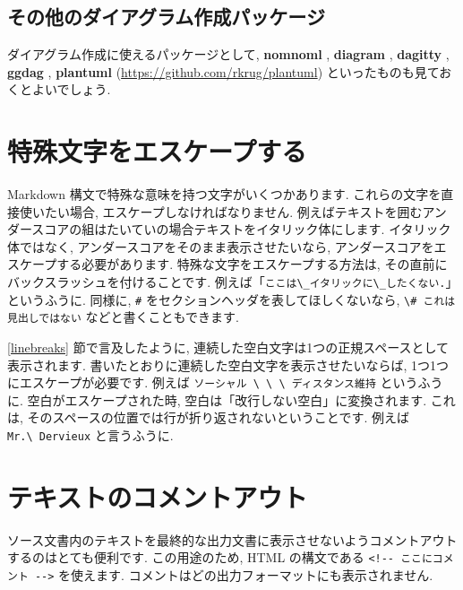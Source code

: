 \documentclass[
  11pt,
  lualatex,
  ja=standard]{bxjsreport}
\begin{document}
\hypertarget{other-packages-for-making-diagrams}{%
\subsection{その他のダイアグラム作成パッケージ}\label{other-packages-for-making-diagrams}}

ダイアグラム作成に使えるパッケージとして, \textbf{nomnoml} \autocite{R-nomnoml}, \textbf{diagram} \autocite{R-diagram}, \textbf{dagitty} \autocite{R-dagitty}, \textbf{ggdag} \autocite{R-ggdag}, \textbf{plantuml} (\url{https://github.com/rkrug/plantuml}) といったものも見ておくとよいでしょう.

\hypertarget{special-chars}{%
\section{特殊文字をエスケープする}\label{special-chars}}

Markdown 構文で特殊な意味を持つ文字がいくつかあります. これらの文字を直接使いたい場合, エスケープしなければなりません. 例えばテキストを囲むアンダースコアの組はたいていの場合テキストをイタリック体にします. イタリック体ではなく, アンダースコアをそのまま表示させたいなら, アンダースコアをエスケープする必要があります. 特殊な文字をエスケープする方法は, その直前にバックスラッシュを付けることです. 例えば「\texttt{ここは\textbackslash{}\_イタリックに\textbackslash{}\_したくない.}」というふうに. 同様に, \texttt{\#} をセクションヘッダを表してほしくないなら, \texttt{\textbackslash{}\#\ これは見出しではない} などと書くこともできます.

\ref{linebreaks} 節で言及したように, 連続した空白文字は1つの正規スペースとして表示されます. 書いたとおりに連続した空白文字を表示させたいならば, 1つ1つにエスケープが必要です. 例えば \texttt{ソーシャル \textbackslash{}\ \textbackslash{}\ \textbackslash{}\ ディスタンス維持} というふうに. 空白がエスケープされた時, 空白は「改行しない空白」に変換されます. これは, そのスペースの位置では行が折り返されないということです. 例えば \texttt{Mr.\textbackslash{}\ Dervieux} と言うふうに.

\hypertarget{comments}{%
\section{テキストのコメントアウト}\label{comments}}

ソース文書内のテキストを最終的な出力文書に表示させないようコメントアウトするのはとても便利です. この用途のため, HTML の構文である \texttt{\textless{}!-\/-\ ここにコメント\ -\/-\textgreater{}} を使えます. コメントはどの出力フォーマットにも表示されません.
\end{document}
